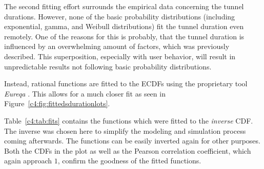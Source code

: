 The second fitting effort surrounds the empirical data concerning the tunnel durations. However, none of the basic probability distributions (including exponential, gamma, and Weibull distributions) fit the tunnel duration even remotely. One of the reasons for this is probably, that the tunnel duration is influenced by an overwhelming amount of factors, which was previously described. This superposition, especially with user behavior, will result in unpredictable results not following basic probability distributions.

Instead, rational functions are fitted to the \glspl{ECDF} using the proprietary tool  \textit{Eureqa} \cite{eureqa_paper, eureqa_software}. This allows for a much closer fit as seen in Figure~\ref{c4:fig:fittedsdurationlots}.

Table~\ref{c4:tab:fits} contains the functions which were fitted to the \textit{inverse} \gls{CDF}. The inverse was chosen here to simplify the modeling and simulation process coming afterwards. The functions can be easily inverted again for other purposes. Both the \glspl{CDF} in the plot as well as the Pearson correlation coefficient, which again approach $1$, confirm the goodness of the fitted functions.














